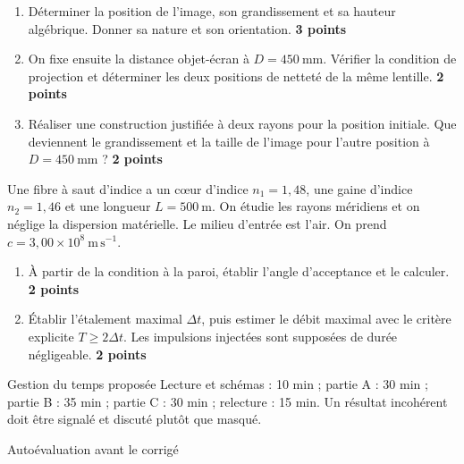 \begin{enumerate}[label=\textcolor{otNavy}{\bfseries B\arabic*.},start=2]
\item Déterminer la position de l'image, son grandissement et sa hauteur algébrique. Donner sa nature et son orientation. \textbf{3 points}
\item On fixe ensuite la distance objet-écran à $D=450\ \mathrm{mm}$. Vérifier la condition de projection et déterminer les deux positions de netteté de la même lentille. \textbf{2 points}
\item Réaliser une construction justifiée à deux rayons pour la position initiale. Que deviennent le grandissement et la taille de l'image pour l'autre position à $D=450\ \mathrm{mm}$ ? \textbf{2 points}
\end{enumerate}
Une fibre à saut d'indice a un cœur d'indice $n_1=1{,}48$, une gaine d'indice $n_2=1{,}46$ et une longueur $L=500\ \mathrm{m}$. On étudie les rayons méridiens et on néglige la dispersion matérielle. Le milieu d'entrée est l'air. On prend $c=3{,}00\times10^8\ \mathrm{m\,s^{-1}}$.
\begin{enumerate}[label=\textcolor{otNavy}{\bfseries C\arabic*.}]
\item À partir de la condition à la paroi, établir l'angle d'acceptance et le calculer. \textbf{2 points}
\item Établir l'étalement maximal $\Delta t$, puis estimer le débit maximal avec le critère explicite $T\geq2\Delta t$. Les impulsions injectées sont supposées de durée négligeable. \textbf{2 points}
\end{enumerate}
\begin{docu}{Gestion du temps proposée}
Lecture et schémas : 10 min ; partie A : 30 min ; partie B : 35 min ; partie C : 30 min ; relecture : 15 min. Un résultat incohérent doit être signalé et discuté plutôt que masqué.
\end{docu}
\begin{methode}{Autoévaluation avant le corrigé}
\end{methode}

